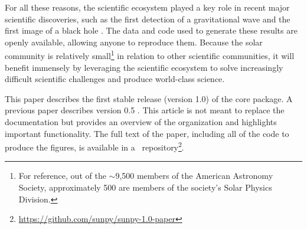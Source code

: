 For all these reasons, the scientific \python ecosystem played a key role in recent major scientific discoveries, such as the first detection of a gravitational wave \citep{ligo_scientific_collaboration_and_virgo_collaboration_observation_2016} and the first image of a black hole \citep{collaboration_first_2019}.
The data and code used to generate these results are openly available, allowing anyone to reproduce them.
Because the solar community is relatively small\footnote{For reference, out of the $\sim$9,500 members of the American Astronomy Society, approximately 500 are members of the society's Solar Physics Division.} in relation to other scientific communities, it will benefit immensely by leveraging the \python scientific ecosystem to solve increasingly difficult scientific challenges and produce world-class science.

This paper describes the first stable release (version 1.0) of the \sunpypkg core package.
A previous paper describes version 0.5 \citep{Community:2015cy}.
This article is not meant to replace the \sunpypkg documentation but provides an overview of the organization and highlights important functionality.
The full text of the paper, including all of the code to produce the figures, is available in a \github\, repository\footnote{\url{https://github.com/sunpy/sunpy-1.0-paper}}.
